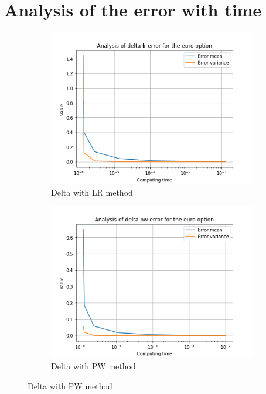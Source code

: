 \documentclass[12pt,a4paper,fleqn]{article}
\begin{document}
\section{Analysis of the error with time}
\begin{figure}
  \centering
      \begin{subfigure}[b]{0.45\textwidth}
          \includegraphics[width=\textwidth]{graphs/eurodeltalrtime.png}
          \caption{Delta with LR method}
      \end{subfigure}
      \begin{subfigure}[b]{0.45\textwidth}
          \includegraphics[width=\textwidth]{graphs/eurodeltapwtime.png}
          \caption{Delta with PW method}
      \end{subfigure}


\end{figure}
\end{document}
